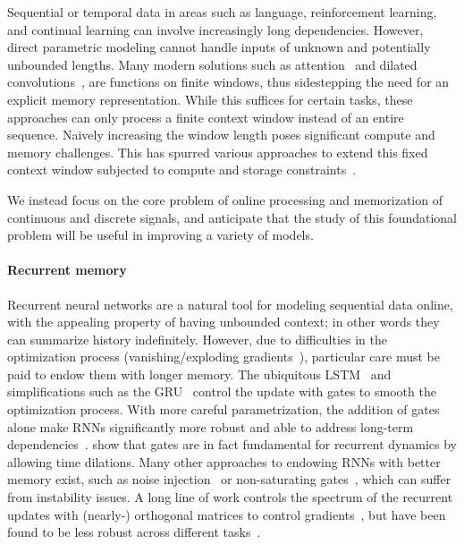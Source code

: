 \documentclass[../hippo.tex]{subfiles}
\begin{document}
Sequential or temporal data in areas such as language, reinforcement learning, and continual learning can involve increasingly long dependencies.
However, direct parametric modeling cannot handle inputs of unknown and potentially unbounded lengths.
Many modern solutions
such as attention~\citep{vaswani2017attention} and dilated convolutions~\citep{bai2018empirical},
are functions on finite windows, thus
sidestepping the need for an explicit memory representation.
While this suffices for certain tasks,
these approaches can only process a finite context window instead of an entire sequence.
Naively increasing the window length poses significant compute and memory challenges.
This has spurred various approaches to extend this fixed context window
subjected to compute and storage constraints~\citep{trellisnet, wu2019pay,
  dai2019transformer, child2019generating, sukhbaatar2019adaptive,
  rae2019compressive, kitaev2020reformer, roy2020efficient}.

We instead focus on the core problem of online processing and memorization of
continuous and discrete signals,
and anticipate that the study of this
foundational problem will be useful in improving a variety of models.


\paragraph{Recurrent memory}
Recurrent neural networks are a natural tool for modeling sequential data online, with the appealing property of having unbounded context; in other words they can summarize history indefinitely.
However, due to difficulties in the optimization process (vanishing/exploding gradients~\citep{pascanu2013difficulty}), particular care must be paid to endow them with longer memory.
The ubiquitous LSTM~\citep{lstm} and simplifications such as the
GRU~\citep{chung2014empirical} control the update with gates to smooth the
optimization process.
With more careful parametrization, the addition of gates alone make RNNs significantly more robust and able to address long-term dependencies~\citep{gu2020improving}.
\citet{tallec2018can} show that gates are in fact fundamental for recurrent dynamics by allowing time dilations.
Many other approaches to endowing RNNs with better memory exist, such as noise injection~\citep{gulcehre2016noisy} or non-saturating gates~\citep{chandar2019towards}, which can suffer from instability issues.
A long line of work controls the spectrum of the recurrent updates with (nearly-) orthogonal matrices to control gradients~\citep{arjovsky2016unitary},
but have been found to be less robust across different tasks~\citep{henaff2016recurrent}.
\end{document}
